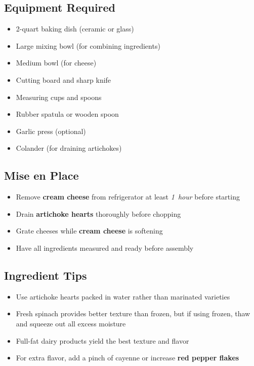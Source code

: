 \documentclass[11pt,letterpaper]{article}
\begin{document}
\newpage

{\small
\setlength{\columnsep}{20pt}
\setlength{\multicolsep}{6pt}
\begin{multicols}{2}
\setlength{\parindent}{0pt}
\setlength{\parskip}{4pt}

\subsection*{Equipment Required}
\begin{itemize}
    \item 2-quart baking dish (ceramic or glass)
    \item Large mixing bowl (for combining ingredients)
    \item Medium bowl (for cheese)
    \item Cutting board and sharp knife
    \item Measuring cups and spoons
    \item Rubber spatula or wooden spoon
    \item Garlic press (optional)
    \item Colander (for draining artichokes)
\end{itemize}

\subsection*{Mise en Place}
\begin{itemize}
    \item Remove \textbf{cream cheese} from refrigerator at least \textit{1~hour} before starting
    \item Drain \textbf{artichoke hearts} thoroughly before chopping
    \item Grate cheeses while \textbf{cream cheese} is softening
    \item Have all ingredients measured and ready before assembly
\end{itemize}

\subsection*{Ingredient Tips}
\begin{itemize}
    \item Use artichoke hearts packed in water rather than marinated varieties
    \item Fresh spinach provides better texture than frozen, but if using frozen, thaw and squeeze out all excess moisture
    \item Full-fat dairy products yield the best texture and flavor
    \item For extra flavor, add a pinch of cayenne or increase \textbf{red pepper flakes}
\end{itemize}


\end{multicols}}
\end{document}
